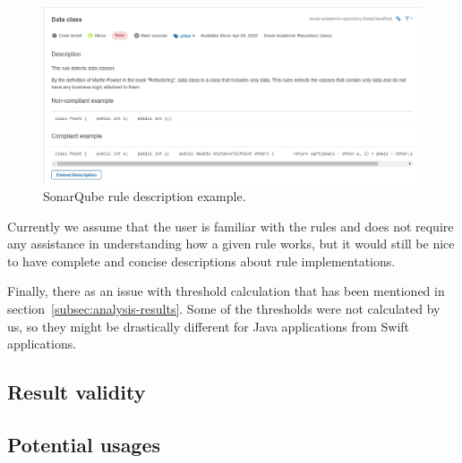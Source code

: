 \begin{figure}
    \includegraphics[scale=0.45]{figures/sonarqube_description.png}
    \caption{SonarQube rule description example.}
    \label{fig:sonarqube_description_example}
\end{figure}

Currently we assume that the user is familiar with the rules and does not require any assistance in understanding how
a given rule works, but it would still be nice to have complete and concise descriptions about rule implementations.

Finally, there as an issue with threshold calculation that has been mentioned in section~\ref{subsec:analysis-results}.
Some of the thresholds were not calculated by us, so they might be drastically different for Java applications from
Swift applications.

\FloatBarrier

\subsection{Result validity}\label{subsec:result-validity}


\subsection{Potential usages}\label{subsec:potential-usages}

